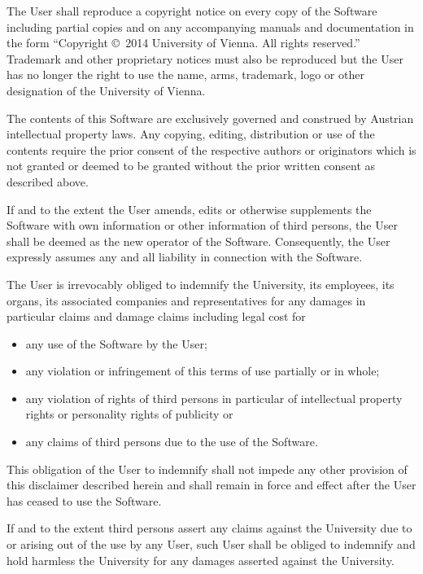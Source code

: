 \documentclass[a4paper,11pt,DIV=15,openany,twoside=false]{scrbook}
\begin{document}
{\begin{shaded}
The User shall reproduce a copyright notice on every copy of the Software including partial copies and on any accompanying manuals and documentation in the form ``Copyright \copyright\ 2014 University of Vienna. All rights reserved.'' Trademark and other proprietary notices must also be reproduced but the User has no longer the right to use the name, arms, trademark, logo or other designation of the University of Vienna.


The contents of this Software are exclusively governed and construed by Austrian intellectual property laws. Any copying, editing, distribution or use of the contents require the prior consent of the respective authors or originators which is not granted or deemed to be granted without the prior written consent as described above.

If and to the extent the User amends, edits or otherwise supplements the Software with own information or other information of third persons, the User shall be deemed as the new operator of the Software. Consequently, the User expressly assumes any and all liability in connection with the Software.


The User is irrevocably obliged to indemnify the University, its employees, its organs, its associated companies and representatives for any damages in particular claims and damage claims including legal cost for
\begin{itemize}
  \item any use of the Software by the User;
  \item any violation or infringement of this terms of use partially or in whole;
  \item any violation of rights of third persons in particular of intellectual property rights or personality rights of publicity or
  \item any claims of third persons due to the use of the Software.
\end{itemize}

This obligation of the User to indemnify shall not impede any other provision of this disclaimer described herein and shall remain in force and effect after the User has ceased to use the Software.

If and to the extent third persons assert any claims against the University due to or arising out of the use by any User, such User shall be obliged to indemnify and hold harmless the University for any damages asserted against the University.


\end{shaded}}
\end{document}

